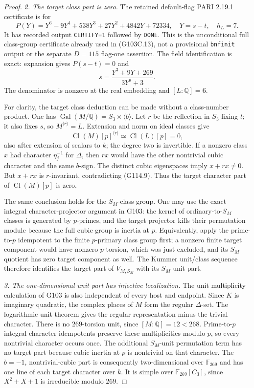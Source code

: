 \begin{proof}
\emph{2. The target class part is zero.}
The retained default-flag PARI 2.19.1 certificate is for
\[
 P(Y)=Y^6-9Y^4+538Y^3+27Y^2+4842Y+72334,
 \quad Y=s-t,\quad h_L=7.
 \tag{G114.8}
\]
It has recorded output \texttt{CERTIFY=1} followed by
\texttt{DONE}.  This is the unconditional full class-group
certificate already used in (G103C.13), not a provisional
\texttt{bnfinit} output or the separate $D=115$ flag-one assertion.
The field identification is exact: expansion gives $P(s-t)=0$ and
\[
       s=\frac{Y^3+9Y+269}{3Y^2+3}.
\]
The denominator is nonzero at the real embedding and $[L:\mathbb Q]=6$.

For clarity, the target class deduction can be made without a
class-number product.  One has
$\operatorname{Gal}(M/\mathbb Q)=S_3\times\langle b\rangle$.
Let $r$ be the reflection in $S_3$ fixing $t$; it also fixes $s$,
so $M^{\langle r\rangle}=L$.
Extension and norm on ideal classes give
\[
       \operatorname{Cl}(M)[p]^{\langle r\rangle}
                   \simeq\operatorname{Cl}(L)[p]=0,
 \tag{G114.9}
\]
also after extension of scalars to $k$; the degree two is invertible.
If a nonzero class $x$ had character $\eta_j^{-1}$ for $\Delta$,
then $rx$ would have the other nontrivial cubic character and the
same $b$-sign.  The distinct cubic eigenspaces imply $x+rx\ne0$.
But $x+rx$ is $r$-invariant, contradicting (G114.9).
Thus the target character part of $\operatorname{Cl}(M)[p]$ is zero.

The same conclusion holds for the $S_M$-class group.  One may use
the exact integral character-projector argument in G103: the
kernel of ordinary-to-$S_M$ classes is generated by $p$-primes,
and the target projector kills their permutation module because
the full cubic group is inertia at $p$.
Equivalently, apply the prime-to-$p$ idempotent to the finite
$p$-primary class group first; a nonzero finite target component
would have nonzero $p$-torsion, which was just excluded, and its
$S_M$ quotient has zero target component as well.
The Kummer unit/class sequence therefore identifies the target
part of $V_{M,S_M}$ with its $S_M$-unit part.

\emph{3. The one-dimensional unit part has injective localization.}
The unit multiplicity calculation of G103 is also independent
of every host and endpoint.  Since $K$ is imaginary quadratic,
the complex places of $M$ form the regular $\Delta$-set.
The logarithmic unit theorem gives the regular representation
minus the trivial character.  There is no $269$-torsion unit,
since $[M:\mathbb Q]=12<268$.
Prime-to-$p$ integral character idempotents preserve these
multiplicities modulo $p$, so every nontrivial character occurs
once.  The additional $S_M$-unit permutation term has no target
part because cubic inertia at $p$ is nontrivial on that character.
The $b=-1$, nontrivial-cubic part is consequently two-dimensional
over $\mathbb F_{269}$ and has one line of each target character
over $k$.  It is simple over $\mathbb F_{269}[C_3]$, since
$X^2+X+1$ is irreducible modulo $269$.


\end{proof}
